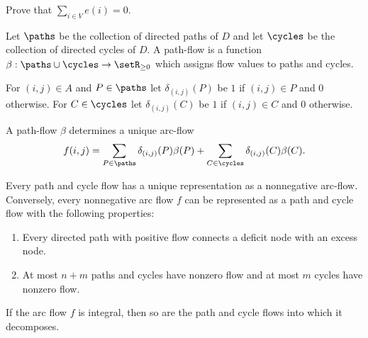   
  \begin{exercise}
    Prove that $\sum_{i \in V} e(i) = 0$. 
  \end{exercise}



  
  Let $\paths$ be the collection of directed paths  of $D$ and
  let $\cycles$ be the collection of directed cycles of $D$. A
  path-flow is a function $\beta: \paths \cup \cycles \to \setR_{\geq0}$ which assigns
  flow values to paths and cycles. 

  For $(i,j)\in A$ and $P \in \paths$ let $\delta_{(i,j)}(P)$ be $1$ if $(i,j) \in
  P$ and $0$ otherwise. For $C \in \cycles$ let $\delta_{(i,j)}(C)$ be $1$ if
  $(i,j)\in C$ and $0$ otherwise. 

  A path-flow $\beta$ determines a unique   arc-flow
  \begin{displaymath}
    f(i,j) = \sum_{P \in \paths} \delta_{(i,j)}(P) \beta(P) + \sum_{C \in \cycles} \delta_{(i,j)}(C) \beta(C). 
  \end{displaymath}
    

  
  \begin{theorem}
    \label{thr:Decomp}
    Every path and cycle flow  has a unique representation
    as a  nonnegative arc-flow. Conversely, every nonnegative arc flow
    $f$ can be represented as a path and cycle flow with the following
    properties:
    \begin{enumerate}
    \item Every directed path with positive flow connects a deficit
      node with an excess node.
    \item At most $n+m$ paths and cycles have nonzero flow and at most
      $m$ cycles have nonzero flow.
    \end{enumerate}
    If the arc flow $f$ is integral, then so are the path and cycle
    flows into which it decomposes. 
    
  \end{theorem}

